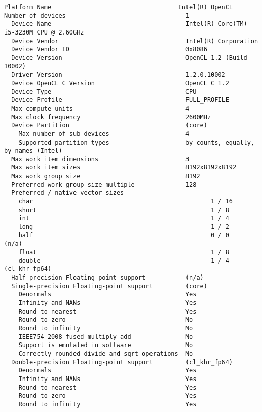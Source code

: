 \documentclass{article}
\begin{document}
\begin{lstlisting}[language={}]
  Platform Name                                   Intel(R) OpenCL
Number of devices                                 1
  Device Name                                     Intel(R) Core(TM) i5-3230M CPU @ 2.60GHz
  Device Vendor                                   Intel(R) Corporation
  Device Vendor ID                                0x8086
  Device Version                                  OpenCL 1.2 (Build 10002)
  Driver Version                                  1.2.0.10002
  Device OpenCL C Version                         OpenCL C 1.2 
  Device Type                                     CPU
  Device Profile                                  FULL_PROFILE
  Max compute units                               4
  Max clock frequency                             2600MHz
  Device Partition                                (core)
    Max number of sub-devices                     4
    Supported partition types                     by counts, equally, by names (Intel)
  Max work item dimensions                        3
  Max work item sizes                             8192x8192x8192
  Max work group size                             8192
  Preferred work group size multiple              128
  Preferred / native vector sizes                 
    char                                                 1 / 16      
    short                                                1 / 8       
    int                                                  1 / 4       
    long                                                 1 / 2       
    half                                                 0 / 0        (n/a)
    float                                                1 / 8       
    double                                               1 / 4        (cl_khr_fp64)
  Half-precision Floating-point support           (n/a)
  Single-precision Floating-point support         (core)
    Denormals                                     Yes
    Infinity and NANs                             Yes
    Round to nearest                              Yes
    Round to zero                                 No
    Round to infinity                             No
    IEEE754-2008 fused multiply-add               No
    Support is emulated in software               No
    Correctly-rounded divide and sqrt operations  No
  Double-precision Floating-point support         (cl_khr_fp64)
    Denormals                                     Yes
    Infinity and NANs                             Yes
    Round to nearest                              Yes
    Round to zero                                 Yes
    Round to infinity                             Yes

\end{lstlisting}
\end{document}
